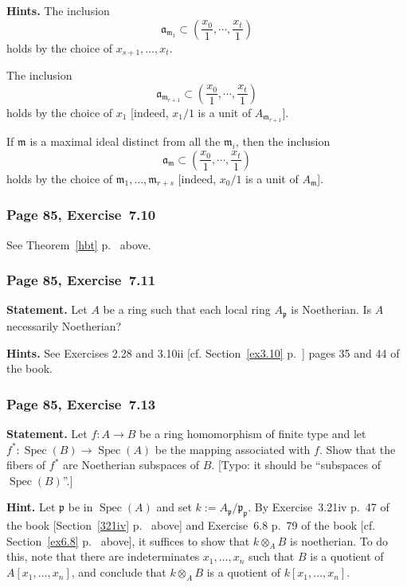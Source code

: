 \documentclass[12pt,letterpaper]{article}%
\newcommand{\mf}{\mathfrak}
\newcommand{\aaa}{\mf a}
\newcommand{\mmm}{\mf m}
\newcommand{\ppp}{\mf p}
\newcommand{\Spec}{\operatorname{Spec}}\newcommand{\Sp}{\operatorname{Spec}}
\newcommand{\nn}{\noindent}
\begin{document}
\nn\textbf{Hints.} The inclusion 
$$
\aaa_{\mmm_1}\subset\left(\frac{x_0}1,\cdots,\frac{x_t}1\right)
$$ 
holds by the choice of $x_{s+1},\ldots,x_t$. 

The inclusion 
$$
\aaa_{\mmm_{r+1}}\subset\left(\frac{x_0}1,\cdots,\frac{x_t}1\right)
$$ 
holds by the choice of $x_1$ [indeed, $x_1/1$ is a unit of $A_{\mmm_{r+1}}$]. 

If $\mmm$ is a maximal ideal distinct from all the $\mmm_i$, then the inclusion 
$$
\aaa_\mmm\subset\left(\frac{x_0}1,\cdots,\frac{x_t}1\right)
$$ 
holds by the choice of $\mmm_1,\ldots,\mmm_{r+s}$ [indeed, $x_0/1$ is a unit of $A_\mmm$].

\subsubsection{Page 85, Exercise~7.10}%

See Theorem~\ref{hbt} p.~\pageref{hbt} above.

\subsubsection{Page 85, Exercise~7.11}%

\textbf{Statement.} Let $A$ be a ring such that each local ring $A_\ppp$ is Noetherian. Is $A$ necessarily Noetherian?

\nn\textbf{Hints.} See Exercises 2.28 and 3.10ii [cf. Section~\ref{ex3.10} p.~\pageref{ex3.10}] pages 35 and 44 of the book. 

\subsubsection{Page 85, Exercise~7.13}%

\textbf{Statement.} Let $f:A\to B$ be a ring homomorphism of finite type and let $f^*: \Spec(B)\to\Spec(A)$ be the mapping associated with $f$. Show that the fibers of $f^*$ are Noetherian subspaces of $B$. [Typo: it should be ``subspaces of $\Spec(B)$''.]

\nn\textbf{Hint.} Let $\ppp$ be in $\Spec(A)$ and set $k:=A_\ppp/\ppp_\ppp$. By Exercise~3.21iv p.~47 of the book [Section~\ref{321iv} p.~\pageref{321iv} above] and Exercise~6.8 p.~79 of the book [cf. Section~\ref{ex6.8} p.~\pageref{ex6.8} above], it suffices to show that $k\otimes_AB$ is noetherian. To do this, note that there are indeterminates $x_1,\dots,x_n$ such that $B$ is a quotient of $A[x_1,\dots,x_n]$, and conclude that $k\otimes_AB$ is a quotient of $k[x_1,\dots,x_n]$.
\end{document}
